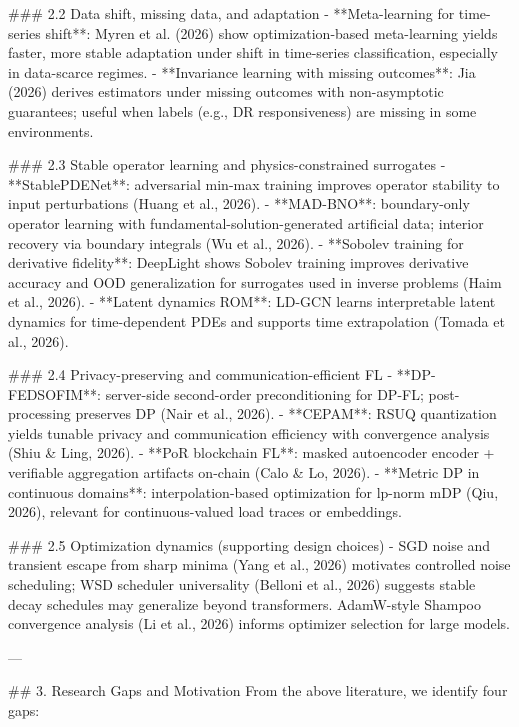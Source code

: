 ### 2.2 Data shift, missing data, and adaptation  
- **Meta-learning for time-series shift**: Myren et al. (2026) show optimization-based meta-learning yields faster, more stable adaptation under shift in time-series classification, especially in data-scarce regimes.  
- **Invariance learning with missing outcomes**: Jia (2026) derives estimators under missing outcomes with non-asymptotic guarantees; useful when labels (e.g., DR responsiveness) are missing in some environments.

### 2.3 Stable operator learning and physics-constrained surrogates  
- **StablePDENet**: adversarial min-max training improves operator stability to input perturbations (Huang et al., 2026).  
- **MAD-BNO**: boundary-only operator learning with fundamental-solution-generated artificial data; interior recovery via boundary integrals (Wu et al., 2026).  
- **Sobolev training for derivative fidelity**: DeepLight shows Sobolev training improves derivative accuracy and OOD generalization for surrogates used in inverse problems (Haim et al., 2026).  
- **Latent dynamics ROM**: LD-GCN learns interpretable latent dynamics for time-dependent PDEs and supports time extrapolation (Tomada et al., 2026).

### 2.4 Privacy-preserving and communication-efficient FL  
- **DP-FEDSOFIM**: server-side second-order preconditioning for DP-FL; post-processing preserves DP (Nair et al., 2026).  
- **CEPAM**: RSUQ quantization yields tunable privacy and communication efficiency with convergence analysis (Shiu & Ling, 2026).  
- **PoR blockchain FL**: masked autoencoder encoder + verifiable aggregation artifacts on-chain (Calo & Lo, 2026).  
- **Metric DP in continuous domains**: interpolation-based optimization for lp-norm mDP (Qiu, 2026), relevant for continuous-valued load traces or embeddings.

### 2.5 Optimization dynamics (supporting design choices)  
- SGD noise and transient escape from sharp minima (Yang et al., 2026) motivates controlled noise scheduling; WSD scheduler universality (Belloni et al., 2026) suggests stable decay schedules may generalize beyond transformers. AdamW-style Shampoo convergence analysis (Li et al., 2026) informs optimizer selection for large models.

---

## 3. Research Gaps and Motivation  
From the above literature, we identify four gaps:

